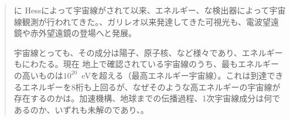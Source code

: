 \begin{quotation}
\MyDIFdelbegin {}\MyDIFdelend \MyDIFaddbegin {}\MyDIFaddend \MyDIFdelbegin {}\MyDIFdelend \MyDIFaddbegin {}\MyDIFaddend に Hess\MyDIFdelbegin {}\MyDIFdelend によって宇宙線\MyDIFdelbegin {}\MyDIFdelend が\MyDIFdelbegin {}\MyDIFdelend \MyDIFaddbegin {}\MyDIFaddend されて以来、\MyDIFdelbegin {}\MyDIFdelend \MyDIFaddbegin {}\MyDIFaddend エネルギー\MyDIFdelbegin {}\MyDIFdelend \MyDIFaddbegin {}\MyDIFaddend 、\MyDIFdelbegin {}\MyDIFdelend \MyDIFaddbegin {}\MyDIFaddend な検出器によって宇宙線\MyDIFdelbegin {}\MyDIFdelend 観測が行われてきた。\MyDIFdelbegin {}\MyDIFdelend \MyDIFaddbegin {}\MyDIFaddend 、ガリレオ以来発達してきた可視光\MyDIFdelbegin {}\MyDIFdelend \MyDIFaddbegin {}\MyDIFaddend も、電波望遠鏡や赤外望遠鏡\MyDIFaddbegin {}\MyDIFaddend の登場\MyDIFdelbegin {}\MyDIFdelend \MyDIFaddbegin {}\MyDIFaddend へと発展\MyDIFdelbegin {}\MyDIFdelend \MyDIFaddbegin {}\MyDIFaddend 。

宇宙線と\MyDIFdelbegin {}\MyDIFdelend \MyDIFaddbegin {}\MyDIFaddend っても、その成分は\MyDIFdelbegin {}\MyDIFdelend 陽子、原子核、\MyDIFdelbegin {}\MyDIFdelend \MyDIFaddbegin {}\MyDIFaddend など様々であり、\MyDIFdelbegin {}\MyDIFdelend \MyDIFaddbegin {}\MyDIFaddend エネルギー\MyDIFaddbegin {}\MyDIFaddend も\MyDIFdelbegin {}\MyDIFdelend \MyDIFaddbegin {}\MyDIFaddend に\MyDIFaddbegin {}\MyDIFaddend わたる。現在 \MyDIFaddbegin {}\MyDIFaddend 地\MyDIFdelbegin {}\MyDIFdelend 上で確認されている宇宙線のうち、最もエネルギーの高いものは$10^{20}$~eVを超える（\MyDIFaddbegin {}\MyDIFaddend 最高エネルギー宇宙線）。これは\MyDIFdelbegin {}\MyDIFdelend \MyDIFaddbegin {}\MyDIFaddend 到達できるエネルギーを\MyDIFdelbegin {}\MyDIFdelend 8桁も上回るが、なぜそのような高\MyDIFaddbegin {}\MyDIFaddend エネルギーの宇宙線が存在するのかは\MyDIFdelbegin {}\MyDIFdelend \MyDIFaddbegin {}\MyDIFaddend 。\MyDIFaddbegin {}\MyDIFaddend 加速機構、地球までの伝播過程、\MyDIFaddbegin {}\MyDIFaddend 1次宇宙線成分は何であるのか\MyDIFaddbegin {}\MyDIFaddend 、いずれも未解\MyDIFdelbegin {}\MyDIFdelend \MyDIFaddbegin {}\MyDIFaddend の\MyDIFdelbegin {}\MyDIFdelend \MyDIFaddbegin {}\MyDIFaddend であり、\MyDIFdelbegin {}\MyDIFdelend \MyDIFaddbegin {}\MyDIFaddend 。
\end{quotation}

